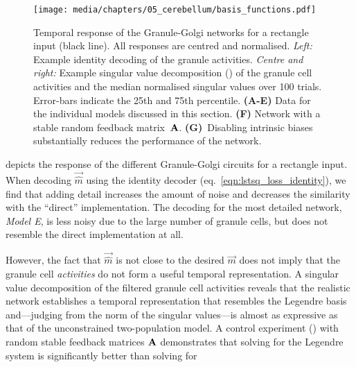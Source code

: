 \begin{figure}
	\centering
    \texttt{[image: media/chapters/05\_cerebellum/basis\_functions.pdf]}%
    {\label{fig:cerebellum_basis_functions_a}}%
    {\label{fig:cerebellum_basis_functions_b}}%
    {\label{fig:cerebellum_basis_functions_c}}%
    {\label{fig:cerebellum_basis_functions_d}}%
    {\label{fig:cerebellum_basis_functions_e}}%
    {\label{fig:cerebellum_basis_functions_f}}%
    {\label{fig:cerebellum_basis_functions_g}}%
    \vspace{0.5em}
    \caption[Temporal response of the Granule-Golgi networks]{
    	Temporal response of the Granule-Golgi networks for a rectangle input (black line).
    	All responses are centred and normalised.
    	\emph{Left:} Example identity decoding of the granule activities.
    	\emph{Centre and right:} Example singular value decomposition (\SVD) of the granule cell activities and the median normalised singular values over \num{100} trials. Error-bars indicate the 25th and 75th percentile.
    	\textbf{(A-E)} Data for the individual models discussed in this section.
    	\textbf{(F)} Network with a stable random feedback matrix~$\mathbf{A}$.
    	\textbf{(G)}~Disabling intrinsic biases substantially reduces the performance of the network.
    }
    \label{fig:cerebellum_basis_functions}
\end{figure}

 depicts the response of the different Granule-Golgi circuits for a rectangle input.
When decoding $\vec{\hat m}$ using the identity decoder (eq.~\ref{eqn:lstsq_loss_identity}), we find that adding detail increases the amount of noise and decreases the similarity with the \enquote{direct} implementation.
The decoding for the most detailed network, \emph{Model E}, is less noisy due to the large number of granule cells, but does not resemble the direct implementation at all.

However, the fact that $\vec{\hat m}$ is not close to the desired $\vec m$ does not imply that the granule cell \emph{activities} do not form a useful temporal representation.
A singular value decomposition of the filtered granule cell activities reveals that the realistic network establishes a temporal representation that resembles the Legendre basis and---judging from the norm of the singular values---is almost as expressive as that of the unconstrained two-population model.
A control experiment () with random stable feedback matrices $\mathbf{A}$ demonstrates that solving for the Legendre system is significantly better than solving for 

